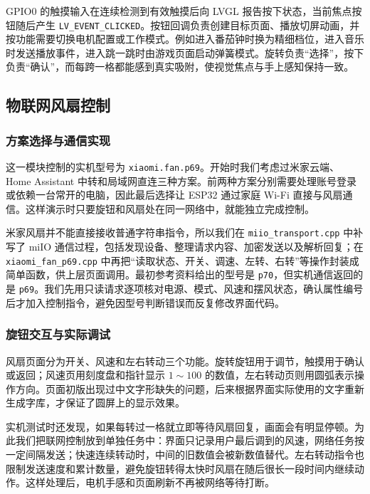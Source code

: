 GPIO0 的触摸输入在连续检测到有效触摸后向 LVGL 报告按下状态，当前焦点按钮随后产生 \texttt{LV\_EVENT\_CLICKED}。按钮回调负责创建目标页面、播放切屏动画，并按功能需要切换电机配置或工作模式。例如进入番茄钟时换为精细档位，进入音乐时发送播放事件，进入跳一跳时由游戏页面启动弹簧模式。旋转负责“选择”，按下负责“确认”，而每跨一格都能感到真实吸附，使视觉焦点与手上感知保持一致。

\subsection{物联网风扇控制}

\subsubsection{方案选择与通信实现}

这一模块控制的实机型号为 \texttt{xiaomi.fan.p69}。开始时我们考虑过米家云端、Home Assistant 中转和局域网直连三种方案。前两种方案分别需要处理账号登录或依赖一台常开的电脑，因此最后选择让 ESP32 通过家庭 Wi-Fi 直接与风扇通信。这样演示时只要旋钮和风扇处在同一网络中，就能独立完成控制。

米家风扇并不能直接接收普通字符串指令，所以我们在 \texttt{miio\_transport.cpp} 中补写了 miIO 通信过程，包括发现设备、整理请求内容、加密发送以及解析回复；在 \texttt{xiaomi\_fan\_p69.cpp} 中再把“读取状态、开关、调速、左转、右转”等操作封装成简单函数，供上层页面调用。最初参考资料给出的型号是 \texttt{p70}，但实机通信返回的是 \texttt{p69}。我们先用只读请求逐项核对电源、模式、风速和摆风状态，确认属性编号后才加入控制指令，避免因型号判断错误而反复修改界面代码。

\subsubsection{旋钮交互与实际调试}

风扇页面分为开关、风速和左右转动三个功能。旋转旋钮用于调节，触摸用于确认或返回；风速页用刻度盘和指针显示 $1\sim100$ 的数值，左右转动页则用圆弧表示操作方向。页面初版出现过中文字形缺失的问题，后来根据界面实际使用的文字重新生成字库，才保证了圆屏上的显示效果。

实机测试时还发现，如果每转过一格就立即等待风扇回复，画面会有明显停顿。为此我们把联网控制放到单独任务中：界面只记录用户最后调到的风速，网络任务按一定间隔发送；快速连续转动时，中间的旧数值会被新数值替代。左右转动指令也限制发送速度和累计数量，避免旋钮转得太快时风扇在随后很长一段时间内继续动作。这样处理后，电机手感和页面刷新不再被网络等待打断。

